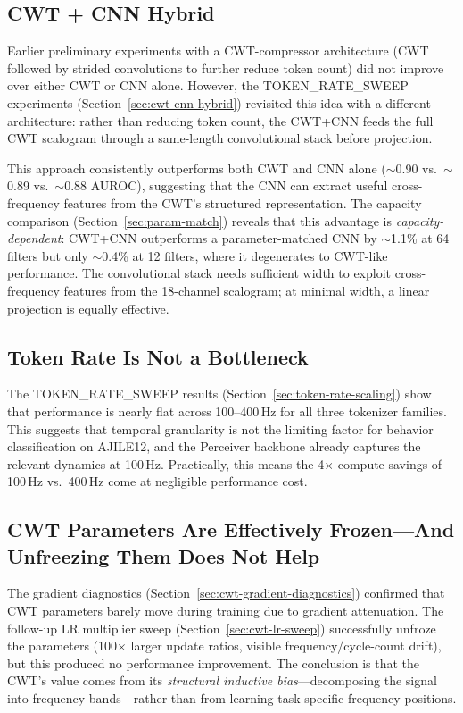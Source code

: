 \documentclass[11pt, a4paper]{article}
\begin{document}
\subsection{CWT + CNN Hybrid}

Earlier preliminary experiments with a CWT-compressor architecture
(CWT followed by strided convolutions to further reduce token count)
did not improve over either CWT or CNN alone. However, the
TOKEN\_RATE\_SWEEP experiments (Section~\ref{sec:cwt-cnn-hybrid})
revisited this idea with a different architecture: rather than
reducing token count, the CWT+CNN feeds the full CWT scalogram
through a same-length convolutional stack before projection.

This approach consistently outperforms both CWT and CNN alone
($\sim$0.90 vs.\ $\sim$0.89 vs.\ $\sim$0.88 AUROC), suggesting
that the CNN can extract useful cross-frequency features from the
CWT's structured representation. The capacity comparison
(Section~\ref{sec:param-match}) reveals that this advantage is
\emph{capacity-dependent}: CWT+CNN outperforms a parameter-matched
CNN by $\sim$1.1\% at 64 filters but only $\sim$0.4\% at 12 filters,
where it degenerates to CWT-like performance. The convolutional stack
needs sufficient width to exploit cross-frequency features from the
18-channel scalogram; at minimal width, a linear projection is
equally effective.

\subsection{Token Rate Is Not a Bottleneck}

The TOKEN\_RATE\_SWEEP results
(Section~\ref{sec:token-rate-scaling}) show that performance is
nearly flat across 100--400\,Hz for all three tokenizer families.
This suggests that temporal granularity is not the limiting factor
for behavior classification on AJILE12, and the Perceiver backbone
already captures the relevant dynamics at 100\,Hz. Practically, this
means the 4$\times$ compute savings of 100\,Hz vs.\ 400\,Hz come at
negligible performance cost.

\subsection{CWT Parameters Are Effectively Frozen---And Unfreezing Them
Does Not Help}

The gradient diagnostics (Section~\ref{sec:cwt-gradient-diagnostics})
confirmed that CWT parameters barely move during training due to
gradient attenuation. The follow-up LR multiplier sweep
(Section~\ref{sec:cwt-lr-sweep}) successfully unfroze the parameters
(100$\times$ larger update ratios, visible frequency/cycle-count
drift), but this produced no performance improvement. The conclusion
is that the CWT's value comes from its \emph{structural inductive
bias}---decomposing the signal into frequency bands---rather than from
learning task-specific frequency positions.
\end{document}
